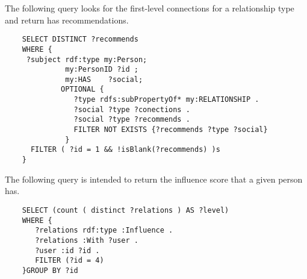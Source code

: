 The following query looks for the first-level connections for a relationship type and return has recommendations.

\begin{verbatim}
    SELECT DISTINCT ?recommends
    WHERE {
     ?subject rdf:type my:Person;
              my:PersonID ?id ;
              my:HAS	?social;
             OPTIONAL {
                ?type rdfs:subPropertyOf* my:RELATIONSHIP .
                ?social ?type ?conections .
                ?social	?type ?recommends .
                FILTER NOT EXISTS {?recommends ?type ?social}
              } 
      FILTER ( ?id = 1 && !isBlank(?recommends) )s
    }
\end{verbatim}


The following query is intended to return the influence score that a given person has.

\begin{verbatim}
    SELECT (count ( distinct ?relations ) AS ?level)
    WHERE {
       ?relations rdf:type :Influence .
       ?relations :With ?user .
       ?user :id ?id .
       FILTER (?id = 4)
    }GROUP BY ?id
\end{verbatim}



